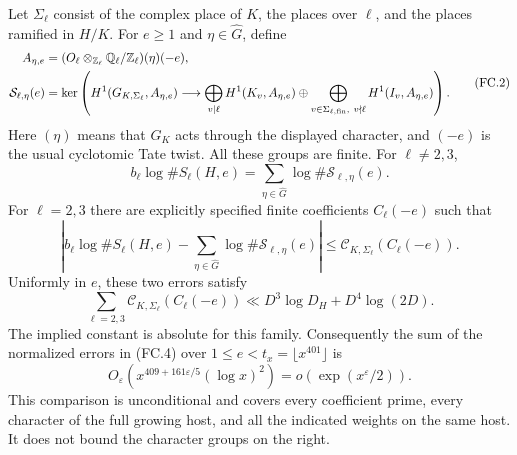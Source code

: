 \begin{theorem}
Let $\Sigma_\ell$ consist of the complex place of $K$,
the places over $\ell$, and the places ramified in $H/K$.
For $e\geq1$ and $\eta\in\widehat G$, define
\[
 \begin{split}
 A_{\eta,e}&=(O_\ell\otimes_{\mathbb Z_\ell}
                  \mathbb Q_\ell/\mathbb Z_\ell)(\eta)(-e),\\
 \mathcal S_{\ell,\eta}(e)&=
 \ker\left(H^1(G_{K,\Sigma_\ell},A_{\eta,e})
 \longrightarrow
 \bigoplus_{v\mid\ell}H^1(K_v,A_{\eta,e})
 \oplus
 \bigoplus_{v\in\Sigma_{\ell,\rm fin},\ v\nmid\ell}
                         H^1(I_v,A_{\eta,e})\right).
 \end{split}                                             \tag{FC.2}
\]
Here $(\eta)$ means that $G_K$ acts through the displayed
character, and $(-e)$ is the usual cyclotomic Tate twist.
All these groups are finite.  For $\ell\ne2,3$,
\[
 b_\ell\log\#S_\ell(H,e)
       =\sum_{\eta\in\widehat G}
                              \log\#\mathcal S_{\ell,\eta}(e).
                                                            \tag{FC.3}
\]
For $\ell=2,3$ there are explicitly specified finite
coefficients $C_\ell(-e)$ such that
\[
 \left|b_\ell\log\#S_\ell(H,e)
       -\sum_{\eta\in\widehat G}
                              \log\#\mathcal S_{\ell,\eta}(e)\right|
       \leq\mathcal C_{K,\Sigma_\ell}(C_\ell(-e)).      \tag{FC.4}
\]
Uniformly in $e$, these two errors satisfy
\[
 \sum_{\ell=2,3}\mathcal C_{K,\Sigma_\ell}(C_\ell(-e))
      \ll D^3\log D_H+D^4\log(2D).                    \tag{FC.5}
\]
The implied constant is absolute for this family.
Consequently the sum of the normalized errors in (FC.4)
over $1\leq e<t_x=\lfloor x^{401}\rfloor$ is
\[
 O_\varepsilon\!\left(
       x^{409+161\varepsilon/5}(\log x)^2\right)
             =o\!\left(\exp(x^\varepsilon/2)\right).  \tag{FC.6}
\]
This comparison is unconditional and covers every
coefficient prime, every character of the full growing
host, and all the indicated weights on the same host.
It does not bound the character groups on the right.
\end{theorem}

